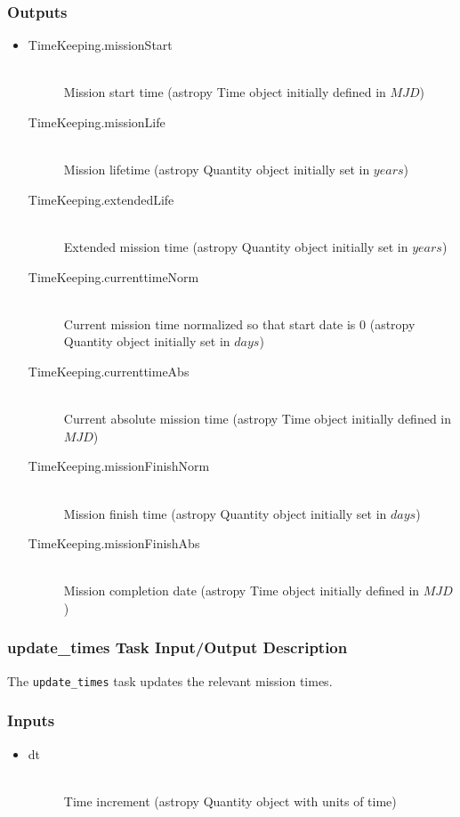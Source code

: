 \documentclass[cleanfoot]{asme2ej}
\begin{document}
\subsubsection*{Outputs}
\begin{itemize}
    \item
    \begin{description}
        \item[TimeKeeping.missionStart] \hfill \\
        Mission start time (astropy Time object initially defined in $ MJD $)
        \item[TimeKeeping.missionLife] \hfill \\
        Mission lifetime (astropy Quantity object initially set in $ years $)
        \item[TimeKeeping.extendedLife] \hfill \\
        Extended mission time (astropy Quantity object initially set in $ years $)
        \item[TimeKeeping.currenttimeNorm] \hfill \\
        Current mission time normalized so that start date is 0 (astropy Quantity object initially set in $ days $)
        \item[TimeKeeping.currenttimeAbs] \label{sec:currenttime}\hfill \\
        Current absolute mission time (astropy Time object initially defined in $ MJD $)
        \item[TimeKeeping.missionFinishNorm] \hfill \\
        Mission finish time (astropy Quantity object initially set in $ days $)
        \item[TimeKeeping.missionFinishAbs] \hfill \\
        Mission completion date (astropy Time object initially defined in $ MJD $)

    \end{description}
\end{itemize}

\subsubsection{update\_times Task Input/Output Description} \label{sec:updatetimestask}
The \verb+update_times+ task updates the relevant mission times.

\subsubsection*{Inputs}
\begin{itemize}
    \item 
    \begin{description}
        \item[dt] \hfill \\
        Time increment (astropy Quantity object with units of time)
    \end{description}
\end{itemize}
\end{document}
